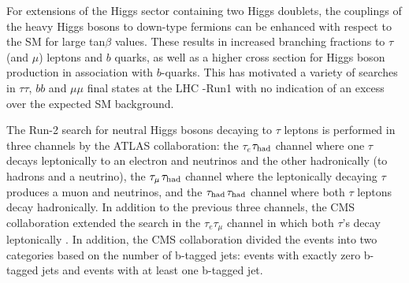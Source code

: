 For extensions of the Higgs sector containing two Higgs doublets, the couplings of the heavy Higgs bosons to down-type fermions can be enhanced with respect to the SM for large tan$\beta$ values.  These results in increased branching fractions to $\tau$ (and $\mu$) leptons and $b$ quarks, as well as a higher cross section for Higgs boson production in association with $b$-quarks. This has motivated a variety of searches in $\tau\tau$, $bb$ and $\mu\mu$ final states at the LHC -Run1 \cite{Hmumu_ref_CMS,Hbb_ref_CMS,Aad:2014vgg,Aad:2012cfr,Aad:2011rv} with no indication of an excess over the expected SM background.


The Run-2 search for neutral Higgs bosons decaying to $\tau$ leptons  is performed in three channels by the  ATLAS collaboration\cite{ATLAS-CONF-2015-061}: the $\tau_{e}$$\tau_{\rm had}$ channel where one $\tau$ decays leptonically to an electron and neutrinos and the
other hadronically (to hadrons and a neutrino),  
the $\tau_{\rm \mu}$$\tau_{\rm had}$ channel where the leptonically decaying $\tau$ produces a muon and neutrinos,  and  the  $\tau_{\rm had}$$\tau_{\rm had}$ channel where both $\tau$ leptons decay hadronically. 
In addition to the previous three channels, the CMS collaboration extended the search in the $\tau_{e}\tau_{\mu}$ channel  in which both  $\tau$'s decay leptonically \cite{CMS:2016pkt}.
In addition, the CMS collaboration divided the events into two categories based on the number of b-tagged jets: events with  exactly zero b-tagged jets and events with at least one b-tagged jet.

